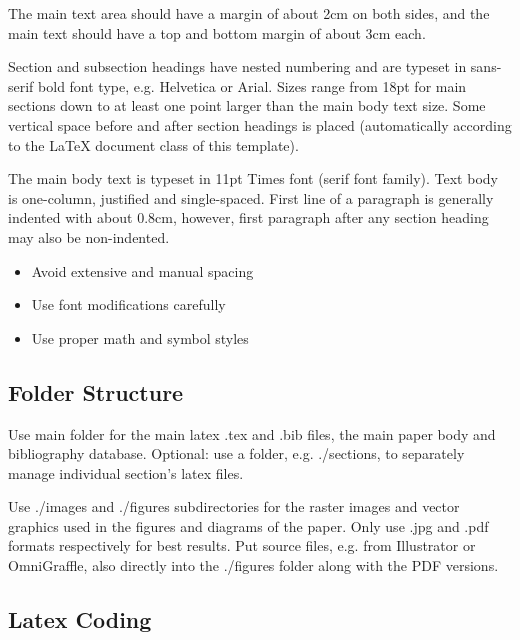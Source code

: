 \documentclass[11pt, a4paper,oneside,chapterprefix=false]{scrbook}
\begin{document}
The main text area should have a margin of about 2cm on both sides, and the main text should have a top and bottom margin of about 3cm each.

Section and subsection headings have nested numbering and are typeset in sans-serif bold font type, e.g. Helvetica or Arial.  Sizes range from 18pt for main sections down to at least one point larger than the main body text size. Some vertical space before and after section headings is placed (automatically according to the LaTeX document class of this template).

The main body text is typeset in 11pt Times font (serif font family). Text body is one-column, justified and single-spaced. First line of a paragraph is generally indented with about 0.8cm, however, first paragraph after any section heading may also be non-indented.

\begin{itemize}
\item Avoid extensive and manual spacing
\item Use font modifications carefully
\item Use proper math and symbol styles
\end{itemize}

\subsection*{Folder Structure}

Use main folder for the main latex .tex and .bib files, the main paper body and bibliography database. Optional: use a folder, e.g. ./sections, to separately manage individual section's latex files.

Use ./images and ./figures subdirectories for the raster images and vector graphics used in the figures and diagrams of the paper.
Only use .jpg and .pdf formats respectively for best results. Put source files, e.g. from Illustrator or OmniGraffle, also directly into the ./figures folder along with the PDF versions.

\subsection*{Latex Coding}
\end{document}
